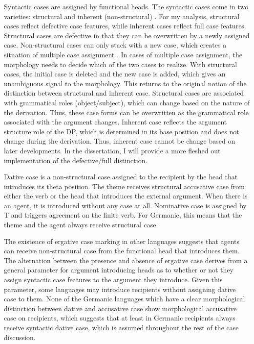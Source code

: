 Syntactic cases are assigned by functional heads. The syntactic cases come in two varieties: structural and inherent (non-structural) \citep{Chomsky.1981}. For my analysis, structural cases reflect defective case features, while inherent cases reflect full case features. Structural cases are defective in that they can be overwritten by a newly assigned case. Non-structural cases can only stack with a new case, which creates a situation of multiple case assignment \citep{Merchant.2006}. In cases of multiple case assignment, the morphology needs to decide which of the two cases to realize. With structural cases, the initial case is deleted and the new case is added, which gives an unambiguous signal to the morphology. This returns to the original notion of the distinction between structural and inherent case. Structural cases are associated with grammatical roles (object/subject), which can change based on the nature of the derivation. Thus, these case forms can be overwritten as the grammatical role associated with the argument changes. Inherent case reflects the argument structure role of the DP, which is determined in its base position and does not change during the derivation. Thus, inherent case cannot be change based on later developments. In the dissertation, I will provide a more fleshed out implementation of the defective/full distinction.

Dative case is a non-structural case assigned to the recipient by the head that introduces its theta position. The theme receives structural accusative case from either the verb or the head that introduces the external argument.  When there is an agent, it is introduced without any case at all. Nominative case is assigned by T and triggers agreement on the finite verb. For Germanic, this means that the theme and the agent always receive structural case.

The existence of ergative case marking in other languages suggests that agents can receive non-structural case from the functional head that introduces them. The alternation between the presence and absence of ergative case derives from a general parameter for argument introducing heads as to whether or not they assign syntactic case features to the argument they introduce. Given this parameter, some languages may introduce recipients without assigning dative case to them. None of the Germanic languages which have a clear morphological distinction between dative and accusative case show morphological accusative case on recipients, which suggests that at least in Germanic recipients always receive syntactic dative case, which is assumed throughout the rest of the case discussion.

